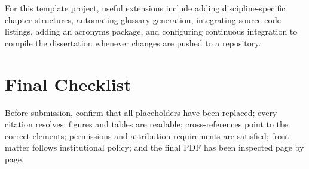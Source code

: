 For this template project, useful extensions include adding discipline-specific chapter structures, automating glossary generation, integrating source-code listings, adding an acronyms package, and configuring continuous integration to compile the dissertation whenever changes are pushed to a repository.

\section{Final Checklist}

Before submission, confirm that all placeholders have been replaced; every citation resolves; figures and tables are readable; cross-references point to the correct elements; permissions and attribution requirements are satisfied; front matter follows institutional policy; and the final PDF has been inspected page by page.
